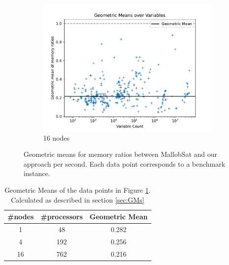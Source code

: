 \documentclass[12pt,a4paper,twoside]{scrartcl}
\numberwithin{equation}{section}
\begin{document}
\begin{figure}
\begin{subfigure}[c]{.45\textwidth}
    \includegraphics[scale=.45]{plots/16node_compare/mem_gm_over_vars.pdf}
    \caption{16 nodes}
  \end{subfigure}
  \caption{Geometric means for memory ratios between MallobSat and our approach per second. Each data point corresponds to a benchmark instance.}
  \label{fig:memGmVars}
\end{figure}

\begin{table}
  \center
  \begin{tabular}{ ccc }
    \toprule
    \#nodes & \#processors & Geometric Mean \\
    \midrule
    1  & 48  & 0.282\\
    4  & 192 & 0.256\\
    16 & 762 & 0.216\\
    \bottomrule
  \end{tabular}
  \caption{Geometric Means of the data points in Figure \ref{fig:memGmVars}. Calculated as described in section \ref{sec:GMs}}
  \label{tab:memGM}
\end{table}
\end{document}
